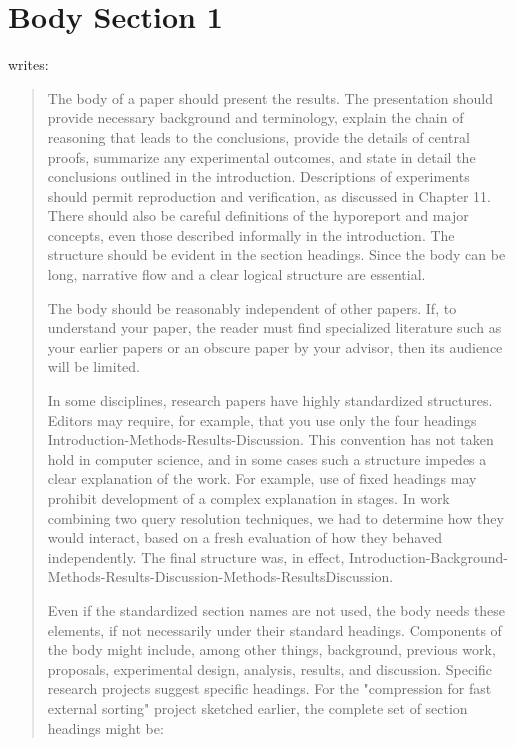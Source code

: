\documentclass[a4paper,oneside,bibliography=totoc]{scrartcl}
\begin{document}
\section{Body Section 1}

\citet{zobel2004} writes:

\blockcquote{zobel2004}{%
  The body of a paper should present the results. The presentation should
  provide necessary background and terminology, explain the chain of reasoning
  that leads to the conclusions, provide the details of central proofs,
  summarize any experimental outcomes, and state in detail the conclusions
  outlined in the introduction. Descriptions of experiments should permit
  reproduction and verification, as discussed in Chapter 11. There should also
  be careful definitions of the hyporeport and major concepts, even those
  described informally in the introduction. The structure should be evident in
  the section headings. Since the body can be long, narrative flow and a clear
  logical structure are essential.

  The body should be reasonably independent of other papers. If, to understand
  your paper, the reader must find specialized literature such as your earlier
  papers or an obscure paper by your advisor, then its audience will be limited.

  In some disciplines, research papers have highly standardized structures.
  Editors may require, for example, that you use only the four headings
  Introduction-Methods-Results-Discussion. This convention has not taken hold in
  computer science, and in some cases such a structure impedes a clear
  explanation of the work. For example, use of fixed headings may prohibit
  development of a complex explanation in stages. In work combining two query
  resolution techniques, we had to determine how they would interact, based on a
  fresh evaluation of how they behaved independently. The final structure was,
  in effect,
  Introduction-Background-Methods-Results-Discussion-Methods-Results­Discussion.

  Even if the standardized section names are not used, the body needs these
  elements, if not necessarily under their standard headings. Components of the
  body might include, among other things, background, previous work, proposals,
  experimental design, analysis, results, and discussion. Specific research
  projects suggest specific headings. For the "compression for fast external
  sorting" project sketched earlier, the complete set of section headings might
  be:

}
\end{document}
